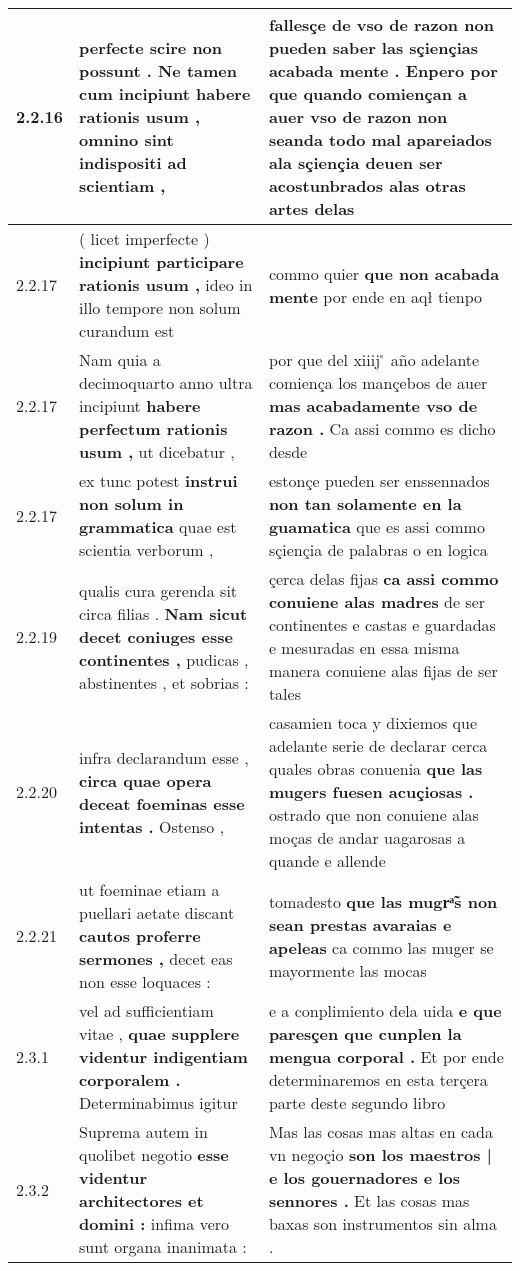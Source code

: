 \begin{tabular}{|p{1cm}|p{6.5cm}|p{6.5cm}|}
2.2.16 & perfecte scire non possunt . \textbf{ Ne tamen cum incipiunt habere rationis usum , } omnino sint indispositi ad scientiam , & fallesçe de vso de razon non pueden saber las sçiençias acabada mente . \textbf{ Enpero por que quando comiençan a auer } vso de razon non seanda todo mal apareiados ala sçiençia deuen ser acostunbrados alas otras artes delas \\\hline
2.2.17 & ( licet imperfecte ) \textbf{ incipiunt participare rationis usum , } ideo in illo tempore non solum curandum est & commo quier \textbf{ que non acabada mente } por ende en aqł tienpo \\\hline
2.2.17 & Nam quia a decimoquarto anno ultra incipiunt \textbf{ habere perfectum rationis usum , } ut dicebatur , & por que del xiiij ̊ año adelante comiença los mançebos de auer \textbf{ mas acabadamente vso de razon . } Ca assi commo es dicho desde \\\hline
2.2.17 & ex tunc potest \textbf{ instrui non solum in grammatica } quae est scientia verborum , & estonçe pueden ser enssennados \textbf{ non tan solamente en la guamatica } que es assi commo sçiençia de palabras o en logica \\\hline
2.2.19 & qualis cura gerenda sit circa filias . \textbf{ Nam sicut decet coniuges esse continentes , } pudicas , abstinentes , et sobrias : & çerca delas fijas \textbf{ ca assi commo conuiene alas madres } de ser continentes e castas e guardadas e mesuradas en essa misma manera conuiene alas fijas de ser tales \\\hline
2.2.20 & infra declarandum esse , \textbf{ circa quae opera deceat foeminas esse intentas . } Ostenso , & casamien toca y dixiemos que adelante serie de declarar cerca quales obras conuenia \textbf{ que las mugers fuesen acuçiosas . } ostrado que non conuiene alas moças de andar uagarosas a quande e allende \\\hline
2.2.21 & ut foeminae etiam a puellari aetate discant \textbf{ cautos proferre sermones , } decet eas non esse loquaces : & tomadesto \textbf{ que las mugrͣ̃s non sean prestas avaraias e apeleas } ca commo las muger se mayormente las mocas \\\hline
2.3.1 & vel ad sufficientiam vitae , \textbf{ quae supplere videntur indigentiam corporalem . } Determinabimus igitur & e a conplimiento dela uida \textbf{ e que paresçen que cunplen la mengua corporal . } Et por ende determinaremos en esta terçera parte deste segundo libro \\\hline
2.3.2 & Suprema autem in quolibet negotio \textbf{ esse videntur architectores et domini : } infima vero sunt organa inanimata : & Mas las cosas mas altas en cada vn negoçio \textbf{ son los maestros | e los gouernadores e los sennores . } Et las cosas mas baxas son instrumentos sin alma . \\\hline

\end{tabular}
